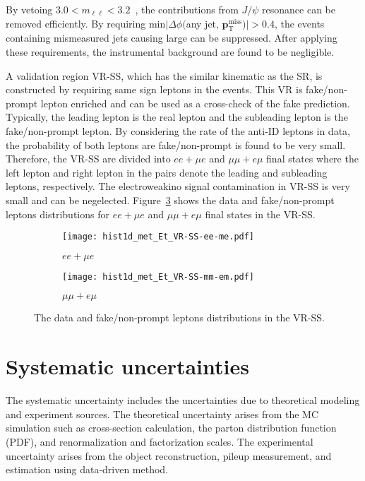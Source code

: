 By vetoing $3.0 < m_{\ell \ell} < 3.2$~{\GeV}, the contributions from $J/\psi$ resonance can be removed efficiently.
By requiring min$|\Delta \phi($any jet, $\mathbf{p}^{\mathrm{miss}}_{\mathrm{T}})| > 0.4$, the events containing mismeasured jets causing large \met can be suppressed.
After applying these requirements, the instrumental \met background are found to be negligible.

A validation region VR-SS, which has the similar kinematic as the SR, is constructed by requiring same sign leptons in the events.
This VR is fake/non-prompt lepton enriched and can be used as a cross-check of the fake prediction. 
Typically, the leading lepton is the real lepton and the subleading lepton is the fake/non-prompt lepton.
By considering the rate of the anti-ID leptons in data, the probability of both leptons are fake/non-prompt is found to be very small.
Therefore, the VR-SS are divided into $ee+\mu e$ and $\mu \mu + e\mu$ final states where the left lepton and right lepton in the pairs denote the leading and subleading leptons, respectively.
The electroweakino signal contamination in VR-SS is very small and can be negelected.
Figure~\ref{fig:bkg_fake_distributions} shows the data and fake/non-prompt leptons \met distributions for $ee+\mu e$ and $\mu \mu + e\mu$ final states in the VR-SS.

\begin{figure}[htbp]
    \begin{center}
        \begin{subfigure}[b]{0.48\textwidth}
            \texttt{[image: hist1d\_met\_Et\_VR-SS-ee-me.pdf]}
            \caption{$ee+\mu e$}
            \label{fig:bkg_ee_mue_fake_distribution}
        \end{subfigure}
        \begin{subfigure}[b]{0.48\textwidth}
            \texttt{[image: hist1d\_met\_Et\_VR-SS-mm-em.pdf]}
            \caption{$\mu \mu + e\mu$}
            \label{fig:bkg_mumu_emu_fake_distribution}
        \end{subfigure}
        \caption{The data and fake/non-prompt leptons \met distributions in the VR-SS.}
        \label{fig:bkg_fake_distributions}
    \end{center}
\end{figure}


\section{Systematic uncertainties}
\label{sec:bkg_systematic_uncertainties}
The systematic uncertainty includes the uncertainties due to theoretical modeling and experiment sources.
The theoretical uncertainty arises from the MC simulation such as cross-section calculation, the parton distribution function (PDF), and renormalization and factorization scales.
The experimental uncertainty arises from the object reconstruction, pileup measurement, and estimation using data-driven method.

